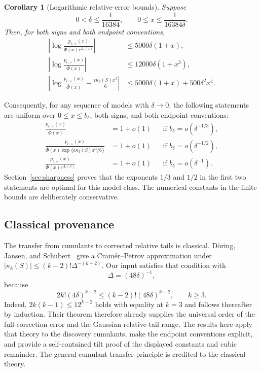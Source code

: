\documentclass[11pt]{article}
\numberwithin{equation}{section}
\newtheorem{corollary}[theorem]{Corollary}
\theoremstyle{remark}
\newcommand{\Phibar}{\overline\Phi}
\begin{document}
\begin{corollary}[Logarithmic relative-error bounds]\label{cor:logbounds}
Suppose
\begin{equation}\label{eq:smallrange}
 0<\delta\le\frac1{16384},\qquad
 0\le x\le\frac1{16384\delta}.
\end{equation}
Then, for both signs and both endpoint conventions,
\begin{align}
 \left|\log\frac{p_{\epsilon,\diamond}(x)}
 {\Phibar(x)e^{\Lambda_\epsilon(x)}}\right|
 &\le5000\delta(1+x),
 \label{eq:logfull}\\
 \left|\log\frac{p_{\epsilon,\diamond}(x)}{\Phibar(x)}\right|
 &\le12000\delta(1+x^3),
 \label{eq:loggaussian}\\
 \left|\log\frac{p_{\epsilon,\diamond}(x)}{\Phibar(x)}
       -\frac{\epsilon\kappa_3(S)x^3}{6}\right|
 &\le5000\delta(1+x)+500\delta^2x^4.
 \label{eq:logcubic}
\end{align}
\end{corollary}

Consequently, for any sequence of models with $\delta\to0$, the following
statements are uniform over $0\le x\le b_\delta$, both signs, and both
endpoint conventions:
\begin{align}
 \frac{p_{\epsilon,\diamond}(x)}{\Phibar(x)}&=1+o(1)
 &&\text{if }b_\delta=o(\delta^{-1/3}),
 \label{eq:gaussianwindow}\\
 \frac{p_{\epsilon,\diamond}(x)}
 {\Phibar(x)\exp\{\epsilon\kappa_3(S)x^3/6\}}&=1+o(1)
 &&\text{if }b_\delta=o(\delta^{-1/2}),
 \label{eq:cubicwindow}\\
 \frac{p_{\epsilon,\diamond}(x)}
 {\Phibar(x)e^{\Lambda_\epsilon(x)}}&=1+o(1)
 &&\text{if }b_\delta=o(\delta^{-1}).
 \label{eq:fullwindow}
\end{align}
Section~\ref{sec:sharpness} proves that the exponents $1/3$ and $1/2$ in
the first two statements are optimal for this model class. The numerical
constants in the finite bounds are deliberately conservative.

\subsection*{Classical provenance}

The transfer from cumulants to corrected relative tails is classical.
D\"oring, Jansen, and Schubert~\cite[Theorem~2.1]{DJS} give a
Cram\'er--Petrov approximation under
$|\kappa_k(S)|\le(k-2)!\Delta^{-(k-2)}$. Our input satisfies that
condition with
\begin{equation}\label{eq:Delta}
 \Delta=(48\delta)^{-1},
\end{equation}
because
\[
 2k!(4\delta)^{k-2}
 \le(k-2)!(48\delta)^{k-2},\qquad k\ge3.
\]
Indeed, $2k(k-1)\le12^{k-2}$ holds with equality at $k=3$ and follows
thereafter by induction. Their theorem therefore already supplies the
universal order of the full-correction error and the Gaussian relative-tail
range. The results here apply that theory to the discovery cumulants, make
the endpoint conventions explicit, and provide a self-contained tilt proof
of the displayed constants and cubic remainder. The general cumulant
transfer principle is credited to the classical theory.
\end{document}
